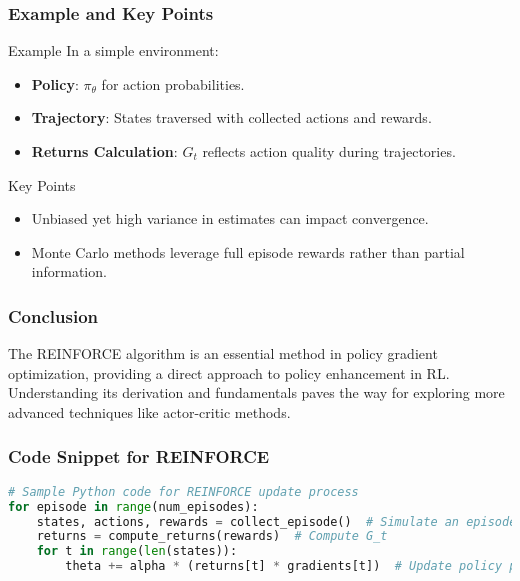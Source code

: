\documentclass[aspectratio=169]{beamer}
\begin{document}
\begin{frame}[fragile]
    \frametitle{Example and Key Points}
    \begin{block}{Example}
        In a simple environment:
        \begin{itemize}
            \item \textbf{Policy}: \( \pi_\theta \) for action probabilities.
            \item \textbf{Trajectory}: States traversed with collected actions and rewards.
            \item \textbf{Returns Calculation}: \( G_t \) reflects action quality during trajectories.
        \end{itemize}
    \end{block}
    
    \begin{block}{Key Points}
        \begin{itemize}
            \item Unbiased yet high variance in estimates can impact convergence.
            \item Monte Carlo methods leverage full episode rewards rather than partial information.
        \end{itemize}
    \end{block}
\end{frame}

\begin{frame}[fragile]
    \frametitle{Conclusion}
    The REINFORCE algorithm is an essential method in policy gradient optimization, providing a direct approach to policy enhancement in RL. Understanding its derivation and fundamentals paves the way for exploring more advanced techniques like actor-critic methods.
\end{frame}

\begin{frame}[fragile]
    \frametitle{Code Snippet for REINFORCE}
    \begin{lstlisting}[language=Python]
# Sample Python code for REINFORCE update process
for episode in range(num_episodes):
    states, actions, rewards = collect_episode()  # Simulate an episode
    returns = compute_returns(rewards)  # Compute G_t
    for t in range(len(states)):
        theta += alpha * (returns[t] * gradients[t])  # Update policy parameters
    \end{lstlisting}
\end{frame}
\end{document}
